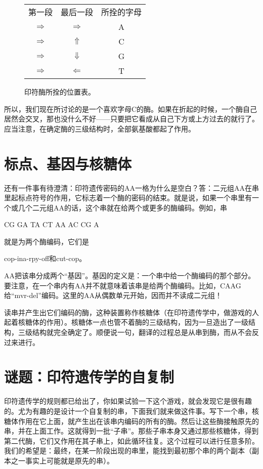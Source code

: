 \begin{figure}
\begin{tabular}{*3c}
第一段 & 最后一段 & 所拴的字母 \\
$\Rightarrow$ & $\Rightarrow$ & A \\
$\Rightarrow$ & $\Uparrow$ & C \\
$\Rightarrow$ & $\Downarrow$ & G \\
$\Rightarrow$ & $\Leftarrow$ & T
\end{tabular}
\caption{印符酶所拴的位置表。}
\end{figure}

所以，我们现在所讨论的是一个喜欢字母C的酶。如果在折起的时候，一个酶自己居然会交叉，那也没什么不好——只要把它看成从自己下方或上方过去的就行了。应当注意，在确定酶的三级结构时，全部氨基酸都起了作用。

\section{标点、基因与核糖体}

还有一件事有待澄清：印符遗传密码的AA一格为什么是空白？答：二元组AA在串里起标点符号的作用，它标志着一个酶的密码的结束。就是说，如果一个串里有一个或几个二元组AA的话，这个串就在给两个或更多的酶编码。例如，串
\begin{center}
CG GA TA CT AA AC CG A
\end{center}
就是为两个酶编码，它们是
\begin{center}
cop-ina-rpy-off\quad 和\quad cut-cop。
\end{center}
AA把该串分成两个“基因”。基因的定义是：一个串中给一个酶编码的那个部分。要注意，在一个串内有AA并不就意味着该串是给两个酶编码。比如，CAAG给“mvr-del”编码。这里的AA从偶数单元开始，因而并不读成二元组！

读串并产生出它们编码的酶，这种装置称作核糖体（在印符遗传学中，做游戏的人起着核糖体的作用）。核糖体一点也管不着酶的三级结构，因为一旦造出了一级结构，三级结构就完全确定了。顺便说一句，翻译的过程总是从串到酶，而从不会反过来进行。

\section{谜题：印符遗传学的自复制}

印符遗传学的规则都已给出了，你如果试验一下这个游戏，就会发现它是很有趣的。尤为有趣的是设计一个自复制的串，下面我们就来做这件事。写下一个串，核糖体作用在它上面，就产生出在该串内编码的所有的酶。然后让这些酶接触原先的串，并在上面工作。这就得到一批“子串”。那些子串本身又通过那些核糖体，得到第二代酶，它们又作用在其子串上，如此循环往复。这个过程可以进行任意多阶。我们的希望是：最终，在某一阶段出现的串里，能找到最初那个串的两个副本（副本之一事实上可能就是原先的串）。

